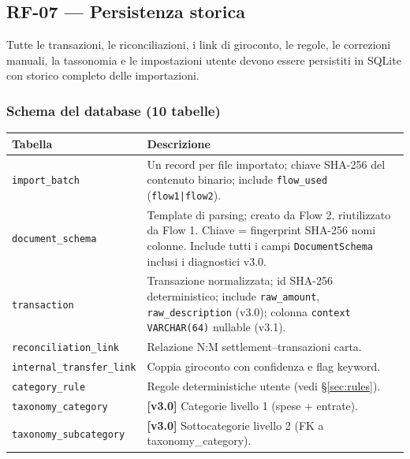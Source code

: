 \documentclass[11pt, a4paper]{article}
\begin{document}
\subsection{RF-07 --- Persistenza storica}
\label{sec:rf07}

Tutte le transazioni, le riconciliazioni, i link di giroconto, le regole, le correzioni
manuali, la tassonomia e le impostazioni utente devono essere persistiti in SQLite con
storico completo delle importazioni.

\subsubsection{Schema del database (10 tabelle)}

\begin{center}
\begin{tabular}{@{}L{5cm} L{8.5cm}@{}}
\toprule
\textbf{Tabella} & \textbf{Descrizione} \\
\midrule
\texttt{import\_batch}            & Un record per file importato; chiave SHA-256 del
                                    contenuto binario; include \texttt{flow\_used}
                                    (\texttt{flow1|flow2}). \\
\texttt{document\_schema}         & Template di parsing; creato da Flow 2, riutilizzato
                                    da Flow 1. Chiave = fingerprint SHA-256 nomi colonne.
                                    Include tutti i campi \texttt{DocumentSchema}
                                    inclusi i diagnostici v3.0. \\
\texttt{transaction}              & Transazione normalizzata; id SHA-256 deterministico;
                                    include \texttt{raw\_amount}, \texttt{raw\_description}
                                    (v3.0); colonna \texttt{context VARCHAR(64)} nullable
                                    (v3.1). \\
\texttt{reconciliation\_link}     & Relazione N:M settlement--transazioni carta. \\
\texttt{internal\_transfer\_link} & Coppia giroconto con confidenza e flag keyword. \\
\texttt{category\_rule}           & Regole deterministiche utente (vedi §\ref{sec:rules}). \\
\texttt{taxonomy\_category}       & \textbf{[v3.0]} Categorie livello 1 (spese + entrate). \\
\texttt{taxonomy\_subcategory}    & \textbf{[v3.0]} Sottocategorie livello 2 (FK a taxonomy\_category). \\

\end{tabular}
\end{center}
\end{document}
